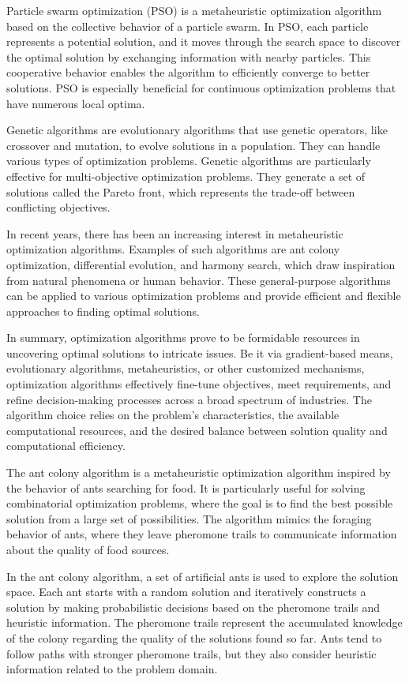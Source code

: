 Particle swarm optimization (PSO) is a metaheuristic optimization algorithm based on the collective behavior of a particle swarm. In PSO, each particle represents a potential solution, and it moves through the search space to discover the optimal solution by exchanging information with nearby particles. This cooperative behavior enables the algorithm to efficiently converge to better solutions. PSO is especially beneficial for continuous optimization problems that have numerous local optima.

Genetic algorithms are evolutionary algorithms that use genetic operators, like crossover and mutation, to evolve solutions in a population. They can handle various types of optimization problems. Genetic algorithms are particularly effective for multi-objective optimization problems. They generate a set of solutions called the Pareto front, which represents the trade-off between conflicting objectives.

In recent years, there has been an increasing interest in metaheuristic optimization algorithms. Examples of such algorithms are ant colony optimization, differential evolution, and harmony search, which draw inspiration from natural phenomena or human behavior. These general-purpose algorithms can be applied to various optimization problems and provide efficient and flexible approaches to finding optimal solutions.

In summary, optimization algorithms prove to be formidable resources in uncovering optimal solutions to intricate issues. Be it via gradient-based means, evolutionary algorithms, metaheuristics, or other customized mechanisms, optimization algorithms effectively fine-tune objectives, meet requirements, and refine decision-making processes across a broad spectrum of industries. The algorithm choice relies on the problem's characteristics, the available computational resources, and the desired balance between solution quality and computational efficiency.

The ant colony algorithm is a metaheuristic optimization algorithm inspired by the behavior of ants searching for food. It is particularly useful for solving combinatorial optimization problems, where the goal is to find the best possible solution from a large set of possibilities. The algorithm mimics the foraging behavior of ants, where they leave pheromone trails to communicate information about the quality of food sources.

In the ant colony algorithm, a set of artificial ants is used to explore the solution space. Each ant starts with a random solution and iteratively constructs a solution by making probabilistic decisions based on the pheromone trails and heuristic information. The pheromone trails represent the accumulated knowledge of the colony regarding the quality of the solutions found so far. Ants tend to follow paths with stronger pheromone trails, but they also consider heuristic information related to the problem domain.

